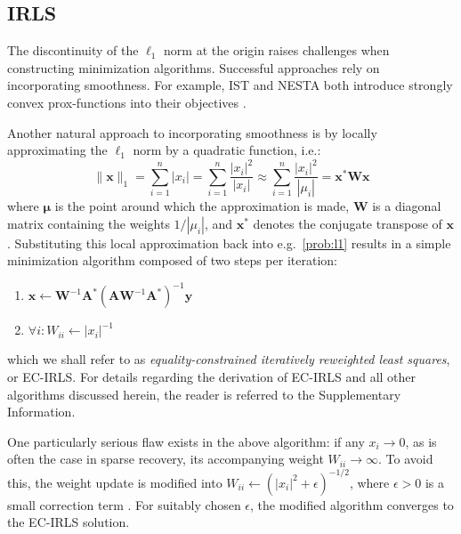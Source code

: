\documentclass[final,5p,times,twocolumn]{elsarticle}
\newcommand{\m}[1]{\boldsymbol{#1}}
\begin{document}
\subsection{IRLS}
\label{ss:irls}
The discontinuity of the $\ell_1$ norm at the origin raises challenges
when constructing minimization algorithms. Successful approaches rely
on incorporating smoothness. For example, IST and NESTA both introduce
strongly convex prox-functions into their objectives
\cite{beck:siam2009,becker:siam2011}.

Another natural approach to incorporating smoothness is by locally
approximating the $\ell_1$ norm by a quadratic function, i.e.:
\begin{equation}
\|\m{x}\|_1 =
 \sum_{i=1}^n |x_i| =
 \sum_{i=1}^n \frac{|x_i|^2}{|x_i|} \approx
 \sum_{i=1}^n \frac{|x_i|^2}{|\mu_i|} =
 \m{x}^* \m{W} \m{x}
\label{eq:l1_local_quad}
\end{equation}
where $\m{\mu}$ is the point around which the approximation is made,
$\m{W}$ is a diagonal matrix containing the weights $1 / |\mu_i|$,
and $\m{x}^*$ denotes the conjugate transpose of $\m{x}$. Substituting
this local approximation back into e.g.~\eqref{prob:l1} results in a
simple minimization algorithm composed of two steps per iteration:
\begin{enumerate}
 \item $\m{x} \gets \m{W}^{-1} \m{A}^*
        \left( \m{A} \m{W}^{-1} \m{A}^* \right)^{-1} \m{y}$
 \item $\forall i : W_{ii} \gets |x_i|^{-1}$
\end{enumerate}
which we shall refer to as \emph{equality-constrained iteratively
reweighted least squares}, or EC-IRLS. For details regarding the
derivation of EC-IRLS and all other algorithms discussed herein,
the reader is referred to the Supplementary Information.

One particularly serious flaw exists in the above algorithm: if any
$x_i \to 0$, as is often the case in sparse recovery, its accompanying
weight $W_{ii} \to \infty$. To avoid this, the weight update is modified
into $W_{ii} \gets (|x_i|^2 + \epsilon)^{-1/2}$, where $\epsilon > 0$ is a
small correction term \cite{daubechies:cpam2010}. For suitably chosen
$\epsilon$, the modified algorithm converges to the EC-IRLS solution.

\end{document}
